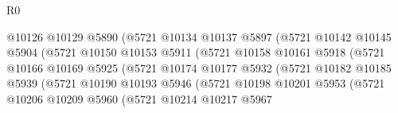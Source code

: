 \begin{lexlean}{R0}
\begin{coremodule}
                                      @10126
                                      @10129
                                      @5890
                                      (@5721
                                        @10134
                                        @10137
                                        @5897
                                        (@5721
                                          @10142
                                          @10145
                                          @5904
                                          (@5721
                                            @10150
                                            @10153
                                            @5911
                                            (@5721
                                              @10158
                                              @10161
                                              @5918
                                              (@5721
                                                @10166
                                                @10169
                                                @5925
                                                (@5721
                                                  @10174
                                                  @10177
                                                  @5932
                                                  (@5721
                                                    @10182
                                                    @10185
                                                    @5939
                                                    (@5721
                                                      @10190
                                                      @10193
                                                      @5946
                                                      (@5721
                                                        @10198
                                                        @10201
                                                        @5953
                                                        (@5721
                                                          @10206
                                                          @10209
                                                          @5960
                                                          (@5721
                                                            @10214
                                                            @10217
                                                            @5967

\end{coremodule}
\end{lexlean}
